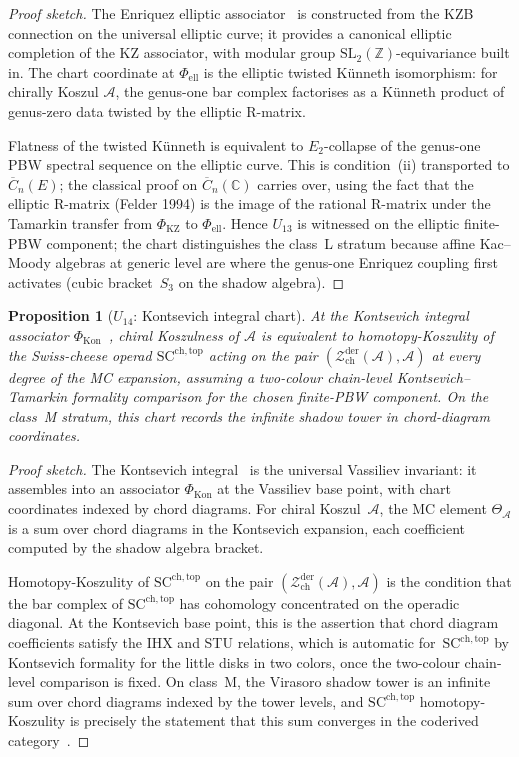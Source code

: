 \documentclass[11pt,reqno]{amsart}
\newtheorem{proposition}[theorem]{Proposition}
\theoremstyle{definition}
\theoremstyle{remark}
\newcommand{\cA}{\mathcal{A}}
\newcommand{\cZ}{\mathcal{Z}}
\newcommand{\FM}{\overline{C}}
\newcommand{\bC}{\mathbb{C}}
\newcommand{\bZ}{\mathbb{Z}}
\newcommand{\Etwo}{E_2}
\newcommand{\SCchtop}{\mathrm{SC}^{\mathrm{ch,top}}}
\numberwithin{equation}{section}
\begin{document}
\begin{proof}[Proof sketch]
The Enriquez elliptic associator~\cite{Enriquez14} is
constructed from the KZB connection on the universal elliptic
curve; it provides a canonical elliptic completion of the KZ
associator, with modular group $\mathrm{SL}_2(\bZ)$-equivariance
built in. The chart coordinate at $\Phi_{\mathrm{ell}}$ is the
elliptic twisted K\"unneth isomorphism: for chirally Koszul
$\cA$, the genus-one bar complex factorises as a K\"unneth
product of genus-zero data twisted by the elliptic R-matrix.

Flatness of the twisted K\"unneth is equivalent to
$\Etwo$-collapse of the genus-one PBW spectral sequence on the
elliptic curve. This is condition~(ii) transported to
$\FM_n(E)$; the classical proof on $\FM_n(\bC)$ carries over,
using the fact that the elliptic R-matrix (Felder 1994) is the
image of the rational R-matrix under the Tamarkin transfer
from $\Phi_{\mathrm{KZ}}$ to $\Phi_{\mathrm{ell}}$.
Hence $U_{13}$ is witnessed on the elliptic finite-PBW component;
the chart
distinguishes the class~L stratum because affine Kac--Moody
algebras at generic level are where the genus-one Enriquez
coupling first activates (cubic bracket~$S_3$ on the shadow
algebra).
\end{proof}

\begin{proposition}[$U_{14}$: Kontsevich integral chart]
\label{prop:kontsevich-chart}
At the Kontsevich integral associator
$\Phi_{\mathrm{Kon}}$~\cite{Kontsevich93}, chiral Koszulness of
$\cA$ is equivalent to homotopy-Koszulity of the Swiss-cheese
operad $\SCchtop$ acting on the pair
$(\cZ^{\mathrm{der}}_{\mathrm{ch}}(\cA), \cA)$ at every degree of
the MC expansion, assuming a two-colour chain-level
Kontsevich--Tamarkin formality comparison for the chosen
finite-PBW component.
On the class~M stratum, this chart records the infinite shadow
tower in chord-diagram coordinates.
\end{proposition}

\begin{proof}[Proof sketch]
The Kontsevich integral~\cite{Kontsevich93} is the universal
Vassiliev invariant: it assembles into an associator
$\Phi_{\mathrm{Kon}}$ at the Vassiliev base point, with chart
coordinates indexed by chord diagrams. For chiral Koszul~$\cA$,
the MC element $\Theta_\cA$ is a sum over chord diagrams in the
Kontsevich expansion, each coefficient computed by the shadow
algebra bracket.

Homotopy-Koszulity of $\SCchtop$ on the pair
$(\cZ^{\mathrm{der}}_{\mathrm{ch}}(\cA), \cA)$ is the condition
that the bar complex of $\SCchtop$ has cohomology concentrated
on the operadic diagonal. At the Kontsevich base point, this is
the assertion that chord diagram coefficients satisfy the
IHX and STU relations, which is automatic for~$\SCchtop$ by
Kontsevich formality for the little disks in two colors, once the
two-colour chain-level comparison is fixed.
On class~M, the Virasoro shadow tower is an infinite sum over chord
diagrams indexed by
the tower levels, and $\SCchtop$ homotopy-Koszulity is precisely
the statement that this sum converges in the coderived
category~\cite{PP}.
\end{proof}
\end{document}
